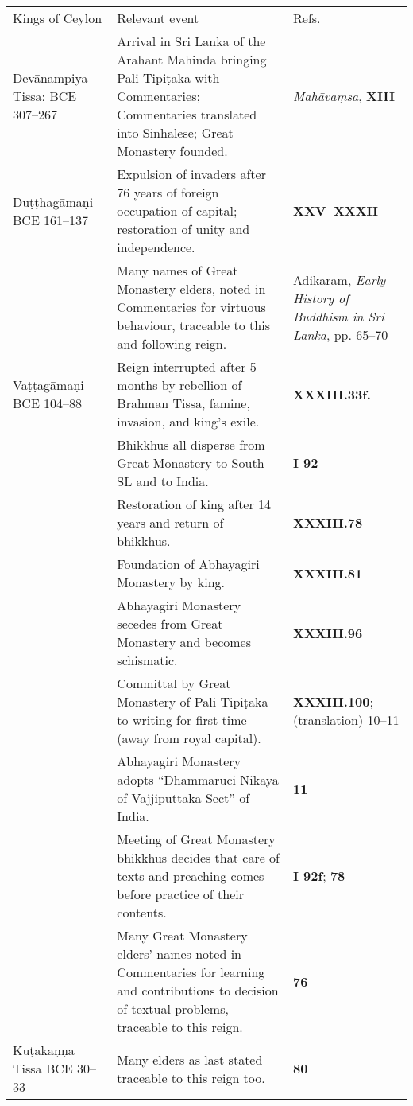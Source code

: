 

\ifplastex
\begin{tabular}{l|l|l}
    Kings of Ceylon & Relevant event & Refs.\\
    Devānampiya Tissa:  BCE 307–267   & Arrival in Sri Lanka of the Arahant Mahinda bringing Pali Tipiṭaka with Commentaries; Commentaries translated into Sinhalese; Great Monastery founded.  & \emph{Mahāvaṃsa}, \textbf{\cite{Mhv} XIII}\\
    Duṭṭhagāmaṇi BCE 161–137 & Expulsion of invaders after 76 years of foreign occupation of capital; restoration of unity and independence.   & \textbf{\cite{Mhv} XXV–XXXII} \\
     & Many names of Great Monastery elders, noted in Commentaries for virtuous behaviour, traceable to this and following reign.  & Adikaram, \emph{Early History of Buddhism in Sri Lanka}, pp. 65–70 \\
    Vaṭṭagāmaṇi  BCE 104–88  & Reign interrupted after 5 months by rebellion of Brahman Tissa, famine, invasion, and king’s exile. & \textbf{\cite{Mhv} XXXIII.33f.} \\
     & Bhikkhus all disperse from Great Monastery to South SL and to India.   & \textbf{\cite{A-a} I 92}\\
     & Restoration of king after 14 years and return of bhikkhus. & \textbf{\cite{Mhv} XXXIII.78}\\
     & Foundation of Abhayagiri Monastery by king.  & \textbf{\cite{Mhv} XXXIII.81}  \\
     & Abhayagiri Monastery secedes from Great Monastery and becomes schismatic. & \textbf{\cite{Mhv} XXXIII.96}\\
     & Committal by Great Monastery of Pali Tipiṭaka to writing for first time (away from royal capital).  & \textbf{\cite{Mhv} XXXIII.100};  \textbf{\cite{Nikāya-s}} (translation) 10–11  \\
     & Abhayagiri Monastery adopts  “Dhammaruci Nikāya of Vajjiputtaka Sect” of India.  & \textbf{\cite{Nikāya-s} 11}\\
     & Meeting of Great Monastery bhikkhus  decides that care of texts and preaching  comes before practice of their contents.  & \textbf{\cite{A-a} I 92f}; \textbf{\cite{EHBC} 78}\\
     & Many Great Monastery elders’ names noted  in Commentaries for learning and contributions to decision of textual  problems, traceable to this reign. & \textbf{\cite{EHBC} 76} \\
    Kuṭakaṇṇa Tissa BCE 30–33 & Many elders as last stated traceable to this reign too. & \textbf{\cite{EHBC} 80} \\

\end{tabular}
